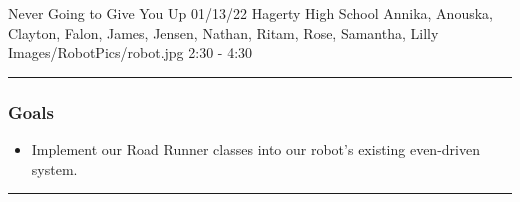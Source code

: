 \insertmeeting 
	{Never Going to Give You Up} 
	{01/13/22} 
	{Hagerty High School}
	{Annika, Anouska, Clayton, Falon, James, Jensen, Nathan, Ritam, Rose, Samantha, Lilly}
	{Images/RobotPics/robot.jpg}
	{2:30 - 4:30}
	
\noindent\hfil\rule{\textwidth}{.4pt}\hfil
\subsubsection*{Goals}
\begin{itemize}
    \item Implement our Road Runner classes into our robot's existing even-driven system. 

\end{itemize} 

\noindent\hfil\rule{\textwidth}{.4pt}\hfil

